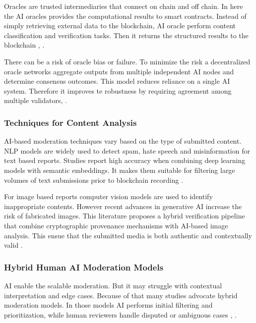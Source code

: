 Oracles are trusted intermediaries that connect on chain and off chain. In here the \ac{AI} oracles provides the computational results to smart contracts. Instead of simply retrieving external data to the blockchain, \ac{AI} oracle perform content classification and verification tasks. Then it returns the structured results to the blockchain \cite{kava2024aipowered}, \cite{zintusart2025empirical}.  

There can be a risk of oracle bias or failure. To minimize the risk a decentralized oracle networks aggregate outputs from multiple independent \ac{AI} nodes and determine consensus outcomes. This model reduces reliance on a single \ac{AI} system. Therefore it improves te robustness by requiring agreement among multiple validators\cite{zintusart2025empirical}, \cite{codezeros2025aipowered}.

\subsubsection{Techniques for Content Analysis}

\ac{AI}-based moderation techniques vary based on the type of submitted content. \ac{NLP} models are widely used to detect spam, hate speech and misinformation for text based reports. Studies report high accuracy when combining deep learning models with semantic embeddings. It makes them suitable for filtering large volumes of text submissions prior to blockchain recording \cite{wani2024ai}.  

For image based reports computer vision models are used to identify inappropriate contents. However recent advances in generative AI increase the risk of fabricated images. This literature proposes a hybrid verification pipeline that combine cryptographic provenance mechanisms with \ac{AI}-based image analysis. This ensue that the submitted media is both authentic and contextually valid \cite{prasad2024blockchain}.

\subsubsection{Hybrid Human AI Moderation Models}

AI enable the scalable moderation. But it may struggle with contextual interpretation and edge cases. Because of that many studies advocate hybrid moderation models. In those models AI performs initial filtering and prioritization, while human reviewers handle disputed or ambiguous cases \cite{mohammadi2025ai}, \cite{kumar2025hybrid}. 

